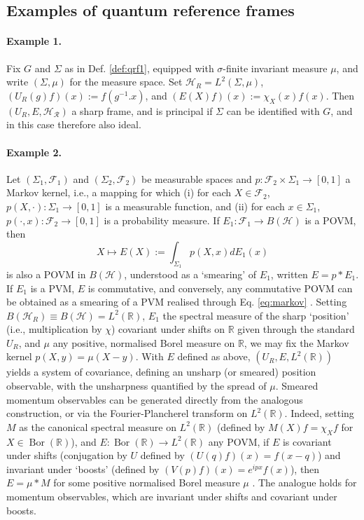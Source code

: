 \documentclass[sn-mathphys-num]{sn-jnl}%
\DeclareMathOperator{\Bor}{Bor}
\numberwithin{equation}{section}
\theoremstyle{thmstyleone}%
\theoremstyle{thmstyletwo}%
\theoremstyle{thmstylethree}%
\begin{document}
\subsection{Examples of quantum reference frames}\label{sec:qrf examples}


\paragraph{Example 1.} Fix $G$ and $\Sigma$ as in Def. \ref{def:qrf1}, equipped with $\sigma$-finite invariant measure $\mu$, and write $(\Sigma,\mu)$ for the measure space. Set $\mathcal{H}_R = L^2(\Sigma, \mu)$, $(U_R(g)f)(x):= f(g^{-1}.x)$, and $(E(X)f)(x):=\chi_X(x)f(x)$. Then $(U_R,E,\mathcal{H_R})$ a sharp frame, and is principal if $\Sigma$ can be identified with $G$, and in this case therefore also ideal.

\paragraph{Example 2.} Let $(\Sigma_1, \mathcal{F}_1)$ and $(\Sigma_2, \mathcal{F}_2)$ be measurable spaces and $p: \mathcal{F}_2 \times \Sigma_1  \to [0,1]$ a Markov kernel, i.e., a mapping for which (i) for each $X\in \mathcal{F}_2$,  $p(X,\cdot):\Sigma_1 \to [0,1]$ is a measurable function, and (ii) for each $x \in \Sigma_1$, $p(\cdot, x):\mathcal{F}_2 \to [0,1]$ is a probability measure. If $E_1:\mathcal{F}_1 \to B(\mathcal{H})$ is a POVM, then 
\begin{equation}\label{eq:markov}
    X \mapsto E(X):=\int_{\Sigma_1}p(X,x)dE_1(x)
\end{equation}
is also a POVM in $B(\mathcal{H})$, understood as a `smearing' of $E_1$, written $E=p * E_1$. If $E_1$ is a PVM, $E$ is commutative, and  conversely, any commutative POVM can be obtained as a smearing of a PVM realised through Eq. \eqref{eq:markov} \cite{holevo2003statistical}. Setting $B(\mathcal{H}_R) \equiv B(\mathcal{H}) = L^2(\mathbb{R})$, $E_1$ the spectral measure of the sharp `position' (i.e., multiplication by $\chi$) covariant under shifts on $\mathbb{R}$ given through the standard $U_R$, and $\mu$ any positive, normalised Borel measure on $\mathbb{R}$, we may fix the Markov kernel $p(X,y)=\mu(X-y)$. With $E$ defined as above, $(U_R,E,L^2(\mathbb{R}))$ yields a system of covariance, defining an unsharp (or smeared) position observable, with the unsharpness quantified by the spread of $\mu$. Smeared momentum observables can be generated directly from the analogous construction, or via the Fourier-Plancherel transform on $L^2(\mathbb{R})$. Indeed, setting $M$ as the canonical spectral measure on $L^2(\mathbb{R})$ (defined by $M(X)f = \chi_X f$ for $X \in \Bor(\mathbb{R})$), and $E:\Bor(\mathbb{R})\to L^2(\mathbb{R})$ any POVM, if $E$ is covariant under shifts (conjugation by $U$ defined by $(U(q)f)(x) = f(x-q)$) and invariant under `boosts' (defined by $(V(p)f)(x)=e^{ipx}f(x)$), then $E=\mu * M$ for some positive normalised Borel measure $\mu$ \cite{carmeli2004position}. The analogue holds for momentum observables, which are invariant under shifts and covariant under boosts.
\end{document}
